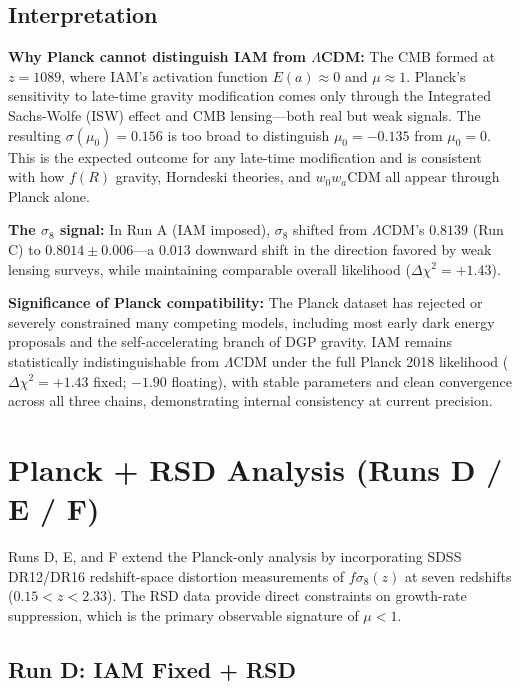 \documentclass[11pt,letterpaper]{article}
\begin{document}
\subsection{Interpretation}

\textbf{Why Planck cannot distinguish IAM from $\Lambda$CDM:} The CMB formed at $z = 1089$, where IAM's activation function $E(a) \approx 0$ and $\mu \approx 1$. Planck's sensitivity to late-time gravity modification comes only through the Integrated Sachs-Wolfe (ISW) effect and CMB lensing---both real but weak signals. The resulting $\sigma(\mu_0) = 0.156$ is too broad to distinguish $\mu_0 = -0.135$ from $\mu_0 = 0$. This is the expected outcome for any late-time modification and is consistent with how $f(R)$ gravity, Horndeski theories, and $w_0w_a$CDM all appear through Planck alone.

\textbf{The $\sigma_8$ signal:} In Run A (IAM imposed), $\sigma_8$ shifted from $\Lambda$CDM's $0.8139$ (Run C) to $0.8014 \pm 0.006$---a $0.013$ downward shift in the direction favored by weak lensing surveys, while maintaining comparable overall likelihood ($\Delta\chi^2 = +1.43$).

\textbf{Significance of Planck compatibility:} The Planck dataset has rejected or severely constrained many competing models, including most early dark energy proposals and the self-accelerating branch of DGP gravity. IAM remains statistically indistinguishable from $\Lambda$CDM under the full Planck 2018 likelihood ($\Delta\chi^2 = +1.43$ fixed; $-1.90$ floating), with stable parameters and clean convergence across all three chains, demonstrating internal consistency at current precision.

\section{Planck + RSD Analysis (Runs D / E / F)}
\label{sec:planck_rsd}

Runs D, E, and F extend the Planck-only analysis by incorporating SDSS DR12/DR16 redshift-space distortion measurements of $f\sigma_8(z)$ at seven redshifts ($0.15 < z < 2.33$). The RSD data provide direct constraints on growth-rate suppression, which is the primary observable signature of $\mu < 1$.

\subsection{Run D: IAM Fixed + RSD}
\end{document}
